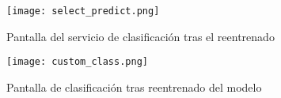 \begin{figure}
	\centering
	\texttt{[image: select\_predict.png]}
	\caption{Pantalla del servicio de clasificación tras el reentrenado}\label{fig:select_predict.png}
\end{figure}

\begin{figure}
	\centering
	\texttt{[image: custom\_class.png]}
	\caption{Pantalla de clasificación tras reentrenado del modelo}\label{fig:custom_class.png}
\end{figure}








